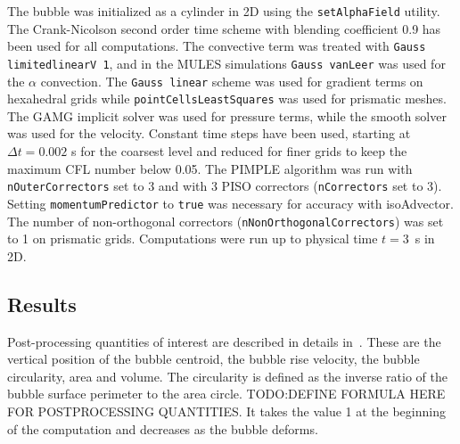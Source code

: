 \documentclass[review]{elsarticle}
\begin{document}
The bubble was initialized as a cylinder in 2D using the \verb+setAlphaField+ utility. The Crank-Nicolson second order time scheme with blending coefficient 0.9 has been used for all computations. The convective term was treated with \verb+Gauss limitedlinearV 1+, and in the MULES simulations \verb+Gauss vanLeer+ was used for the $\alpha$ convection. The \verb+Gauss linear+ scheme was used for gradient terms on hexahedral grids while \verb+pointCellsLeastSquares+ was used for prismatic meshes. The GAMG implicit solver was used for pressure terms, while the smooth solver was used for the velocity. Constant time steps have been used, starting at $\Delta t=0.002$ s for the coarsest level and reduced for finer grids to keep the maximum CFL number below 0.05. The PIMPLE algorithm was run with \verb+nOuterCorrectors+ set to 3 and with 3 PISO correctors (\verb+nCorrectors+ set to 3). Setting \verb+momentumPredictor+ to \verb+true+ was necessary for accuracy with isoAdvector. The number of non-orthogonal correctors (\verb+nNonOrthogonalCorrectors+) was set to 1 on prismatic grids. Computations were run up to physical time $t=3$~s in 2D. 

\subsection{Results}\label{sec_hysingresults}
Post-processing quantities of interest are described in details in~\cite{Hysing2009,Adelsberger2014}. These are the vertical position of the bubble centroid, the bubble rise velocity, the bubble circularity, area and volume. The circularity is defined as the inverse ratio of the bubble surface perimeter to the area circle. TODO:DEFINE FORMULA HERE FOR POSTPROCESSING QUANTITIES. It takes the value 1 at the beginning of the computation and decreases as the bubble deforms.
\end{document}
